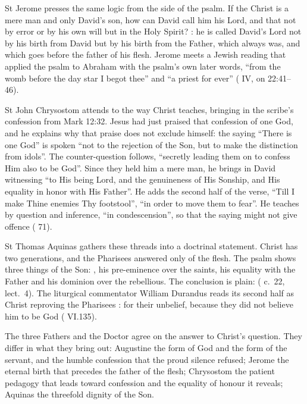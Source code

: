 St Jerome presses the same logic from the side of the psalm. If the Christ is
a mere man and only David's son, how can David call him his Lord, and that not
by error or by his own will but in the Holy Spirit? : he is called David's
Lord not by his birth from David but by his birth from the Father, which always
was, and which goes before the father of his flesh.
Jerome meets a Jewish reading that applied the psalm to Abraham with the
psalm's own later words, ``from the womb before the day star I begot thee''
and ``a priest for ever'' ( IV, on 22:41--46).

St John Chrysostom attends to the way Christ teaches, bringing in the
scribe's confession from Mark 12:32. Jesus had just praised that confession of one God, and he explains why that praise does not
exclude himself: the saying ``There is one God'' is spoken ``not to the
rejection of the Son, but to make the distinction from idols''. The
counter-question follows, ``secretly leading them on to confess Him also to be
God''. Since they held him a mere man, he brings in David witnessing ``to His
being Lord, and the genuineness of His Sonship, and His equality in honor with
His Father''. He adds the second half of the verse, ``Till I make Thine
enemies Thy footstool'', ``in order to move them to fear''. He teaches by
question and inference, ``in condescension'', so that the saying might not give
offence ( 71).

St Thomas Aquinas gathers these threads into a doctrinal statement. Christ has
two generations, and the Pharisees answered only of the flesh. The psalm shows
three things of the Son: , his pre-eminence over the saints, his
equality with the Father and his dominion over the rebellious. The conclusion
is plain:  ( c.~22, lect.~4). The liturgical
commentator William Durandus reads its second half as Christ reproving the
Pharisees : for
their unbelief, because they did not believe him to be God (
VI.135).

The three Fathers and the Doctor agree on the answer to Christ's question. They
differ in what they bring out: Augustine the form of God and the form of the
servant, and the humble confession that the proud silence refused; Jerome the
eternal birth that precedes the father of the flesh; Chrysostom the patient
pedagogy that leads toward confession and the equality of honour it reveals;
Aquinas the threefold dignity of the Son.

